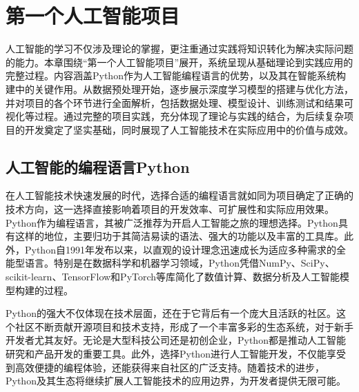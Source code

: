 \chapter{第一个人工智能项目}


人工智能的学习不仅涉及理论的掌握，更注重通过实践将知识转化为解决实际问题的能力。本章围绕“第一个人工智能项目”展开，系统呈现从基础理论到实践应用的完整过程。内容涵盖Python作为人工智能编程语言的优势，以及其在智能系统构建中的关键作用。从数据预处理开始，逐步展示深度学习模型的搭建与优化方法，并对项目的各个环节进行全面解析，包括数据处理、模型设计、训练测试和结果可视化等过程。通过完整的项目实践，充分体现了理论与实践的结合，为后续复杂项目的开发奠定了坚实基础，同时展现了人工智能技术在实际应用中的价值与成效。

\section{人工智能的编程语言Python}

在人工智能技术快速发展的时代，选择合适的编程语言就如同为项目确定了正确的技术方向，这一选择直接影响着项目的开发效率、可扩展性和实际应用效果。Python作为编程语言，其被广泛推荐为开启人工智能之旅的理想选择。Python具有这样的地位，主要归功于其简洁易读的语法、强大的功能以及丰富的工具库。此外，Python自1991年发布以来，以直观的设计理念迅速成长为适应多种需求的全能型语言。特别是在数据科学和机器学习领域，Python凭借NumPy、SciPy、scikit-learn、TensorFlow和PyTorch等库简化了数值计算、数据分析及人工智能模型构建的过程。

Python的强大不仅体现在技术层面，还在于它背后有一个庞大且活跃的社区。这个社区不断贡献开源项目和技术支持，形成了一个丰富多彩的生态系统，对于新手开发者尤其友好。无论是大型科技公司还是初创企业，Python都是推动人工智能研究和产品开发的重要工具。此外，选择Python进行人工智能开发，不仅能享受到高效便捷的编程体验，还能获得来自社区的广泛支持。随着技术的进步，Python及其生态将继续扩展人工智能技术的应用边界，为开发者提供无限可能。

